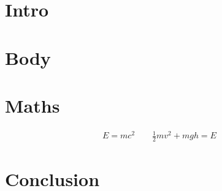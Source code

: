 \documentclass{article}
\begin{document}
\section{Intro}
	\lipsum[2]
\section{Body}
	\lipsum
\section{Maths}
	\begin{align*}
		E = mc^2 \qquad \frac{1}{2}mv^2 + mgh = E
	\end{align*}
\section{Conclusion}
	\lipsum[1]
\end{document}
